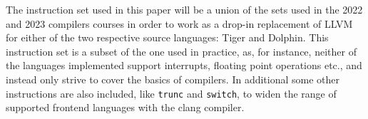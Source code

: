\documentclass{article}
\begin{document}
The instruction set used in this paper will be a union of the sets used in the 2022 and 2023 compilers courses in order to work as a drop-in replacement of LLVM for either of the two respective source languages:  Tiger and Dolphin. This instruction set is a subset of the one used in practice, as, for instance, neither of the languages implemented support interrupts, floating point operations etc., and instead only strive to cover the basics of compilers. In additional some other instructions are also included, like \lstinline!trunc! and \lstinline!switch!, to widen the range of supported frontend languages with the clang compiler.


\end{document}
